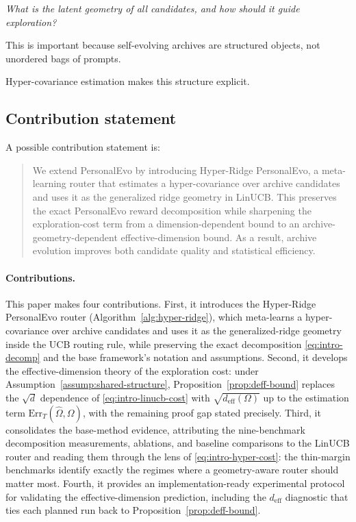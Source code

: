 \documentclass{article} %
\begin{document}
\begin{center}
\emph{What is the latent geometry of all candidates, and how should it guide
exploration?}
\end{center}

This is important because self-evolving archives are structured objects, not
unordered bags of prompts.

Hyper-covariance estimation makes this structure
explicit.

\subsection{Contribution statement}

A possible contribution statement is:

\begin{quote}
We extend PersonalEvo by introducing Hyper-Ridge PersonalEvo, a meta-learning
router that estimates a hyper-covariance over archive candidates and uses it
as the generalized ridge geometry in LinUCB. This preserves the exact
PersonalEvo reward decomposition while sharpening the exploration-cost term
from a dimension-dependent bound to an archive-geometry-dependent
effective-dimension bound. As a result, archive evolution improves both
candidate quality and statistical efficiency.
\end{quote}


\paragraph{Contributions.}
This paper makes four contributions. First, it introduces the Hyper-Ridge PersonalEvo router (Algorithm~\ref{alg:hyper-ridge}), which meta-learns a hyper-covariance over archive candidates and uses it as the generalized-ridge geometry inside the UCB routing rule, while preserving the exact decomposition \eqref{eq:intro-decomp} and the base framework's notation and assumptions. Second, it develops the effective-dimension theory of the exploration cost: under Assumption~\ref{assump:shared-structure}, Proposition~\ref{prop:deff-bound} replaces the $\sqrt{d}$ dependence of \eqref{eq:intro-linucb-cost} with $\sqrt{d_{\mathrm{eff}}(\Omega)}$ up to the estimation term $\mathrm{Err}_T(\widehat\Omega,\Omega)$, with the remaining proof gap stated precisely. Third, it consolidates the base-method evidence, attributing the nine-benchmark decomposition measurements, ablations, and baseline comparisons to the LinUCB router and reading them through the lens of \eqref{eq:intro-hyper-cost}: the thin-margin benchmarks identify exactly the regimes where a geometry-aware router should matter most. Fourth, it provides an implementation-ready experimental protocol for validating the effective-dimension prediction, including the $d_{\mathrm{eff}}$ diagnostic that ties each planned run back to Proposition~\ref{prop:deff-bound}.
\end{document}
